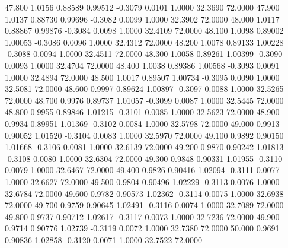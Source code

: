   47.800   1.0156   0.88589   0.99512  -0.3079   0.0101   1.0000  32.3690  72.0000
  47.900   1.0137   0.88730   0.99696  -0.3082   0.0099   1.0000  32.3902  72.0000
  48.000   1.0117   0.88867   0.99876  -0.3084   0.0098   1.0000  32.4109  72.0000
  48.100   1.0098   0.89002   1.00053  -0.3086   0.0096   1.0000  32.4312  72.0000
  48.200   1.0078   0.89133   1.00228  -0.3088   0.0094   1.0000  32.4511  72.0000
  48.300   1.0058   0.89261   1.00399  -0.3090   0.0093   1.0000  32.4704  72.0000
  48.400   1.0038   0.89386   1.00568  -0.3093   0.0091   1.0000  32.4894  72.0000
  48.500   1.0017   0.89507   1.00734  -0.3095   0.0090   1.0000  32.5081  72.0000
  48.600   0.9997   0.89624   1.00897  -0.3097   0.0088   1.0000  32.5265  72.0000
  48.700   0.9976   0.89737   1.01057  -0.3099   0.0087   1.0000  32.5445  72.0000
  48.800   0.9955   0.89846   1.01215  -0.3101   0.0085   1.0000  32.5623  72.0000
  48.900   0.9934   0.89951   1.01369  -0.3102   0.0084   1.0000  32.5798  72.0000
  49.000   0.9913   0.90052   1.01520  -0.3104   0.0083   1.0000  32.5970  72.0000
  49.100   0.9892   0.90150   1.01668  -0.3106   0.0081   1.0000  32.6139  72.0000
  49.200   0.9870   0.90242   1.01813  -0.3108   0.0080   1.0000  32.6304  72.0000
  49.300   0.9848   0.90331   1.01955  -0.3110   0.0079   1.0000  32.6467  72.0000
  49.400   0.9826   0.90416   1.02094  -0.3111   0.0077   1.0000  32.6627  72.0000
  49.500   0.9804   0.90496   1.02229  -0.3113   0.0076   1.0000  32.6784  72.0000
  49.600   0.9782   0.90573   1.02362  -0.3114   0.0075   1.0000  32.6938  72.0000
  49.700   0.9759   0.90645   1.02491  -0.3116   0.0074   1.0000  32.7089  72.0000
  49.800   0.9737   0.90712   1.02617  -0.3117   0.0073   1.0000  32.7236  72.0000
  49.900   0.9714   0.90776   1.02739  -0.3119   0.0072   1.0000  32.7380  72.0000
  50.000   0.9691   0.90836   1.02858  -0.3120   0.0071   1.0000  32.7522  72.0000

